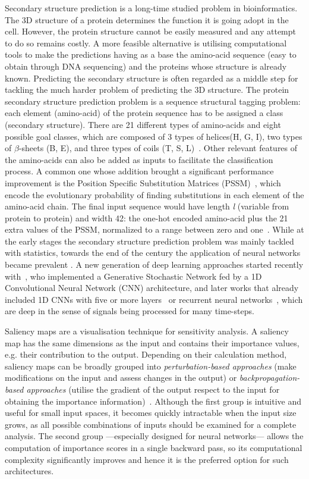 \documentclass{article}
\begin{document}
Secondary structure prediction is a long-time studied problem in bioinformatics. The 3D structure of a protein determines the function it is going adopt in the cell. However, the protein structure cannot be easily measured and any attempt to do so remains costly. A more feasible alternative is utilising computational tools to make the predictions having as a base the amino-acid sequence (easy to obtain through DNA sequencing) and the proteins whose structure is already known. Predicting the secondary structure is often regarded as a middle step for tackling the much harder problem of predicting the 3D structure. The protein secondary structure prediction problem is a sequence structural tagging problem: each element (amino-acid) of the protein sequence has to be assigned a class (secondary structure). There are 21 different types of amino-acids and eight possible goal classes, which are composed of 3 types of helices(H, G, I), two types of $\beta$-sheets (B, E), and three types of coils (T, S, L)~\cite{Kabsch1983}. Other relevant features of the amino-acids can also be added as inputs to facilitate the classification process. A common one whose addition brought a significant performance improvement is the Position Specific Substitution Matrices (PSSM)~\cite{Yang2018}, which encode the evolutionary probability of finding substitutions in each element of the amino-acid chain. The final input sequence would have length \textit{l} (variable from protein to protein) and width 42: the one-hot encoded amino-acid plus the 21 extra values of the PSSM, normalized to a range between zero and one~\cite{Busia2017}. While at the early stages the secondary structure prediction problem was mainly tackled with statistics, towards the end of the century the application of neural networks became prevalent \cite{Rost1993}. A new generation of deep learning approaches started recently with~\cite{Zhou2014}, who implemented a Generative Stochastic Network fed by a 1D Convolutional Neural Network (CNN) architecture, and later works that already included 1D CNNs with five or more layers~\cite{Fang2017,Zhou2018} or recurrent neural networks~\cite{Li2016,Jurtz2017}, which are deep in the sense of signals being processed for many time-steps.

Saliency maps are a visualisation technique for sensitivity analysis. A saliency map has the same dimensions as the input and contains their importance values, e.g. their contribution to the output. Depending on their calculation method, saliency maps can be broadly grouped into \textit{perturbation-based approaches} (make modifications on the input and assess changes in the output) or \textit{backpropagation-based approaches} (utilise the gradient of the output respect to the input for obtaining the importance information)~\cite{Shrikumar2017}. Although the first group is intuitive and useful for small input spaces, it becomes quickly intractable when the input size grows, as all possible combinations of inputs should be examined for a complete analysis. The second group ---especially designed for neural networks--- allows the computation of importance scores in a single backward pass, so its computational complexity significantly improves and hence it is the preferred option for such architectures.
\end{document}
